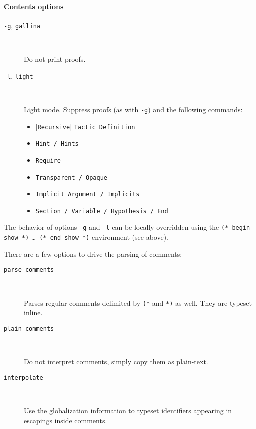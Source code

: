 \paragraph{Contents options}
\begin{description}

\item[\texttt{-g}, \texttt{\mm{}gallina}] ~\par

  Do not print proofs.

\item[\texttt{-l}, \texttt{\mm{}light}] ~\par

  Light mode. Suppress proofs (as with \texttt{-g}) and the following commands:
  \begin{itemize}
  \item {}[\texttt{Recursive}] \texttt{Tactic Definition}
  \item \texttt{Hint / Hints}
  \item \texttt{Require}
  \item \texttt{Transparent / Opaque}
  \item \texttt{Implicit Argument / Implicits}
  \item \texttt{Section / Variable / Hypothesis / End}
  \end{itemize}

\end{description}
The behavior of options \texttt{-g} and \texttt{-l} can be locally
overridden using the \texttt{(* begin show *)} \dots\ \texttt{(* end
  show *)} environment (see above).

There are a few options to drive the parsing of comments:
\begin{description}
\item[\texttt{\mm{}parse-comments}] ~\par

  Parses regular comments delimited by \texttt{(*} and \texttt{*)} as
  well. They are typeset inline.

\item[\texttt{\mm{}plain-comments}] ~\par

  Do not interpret comments, simply copy them as plain-text.

\item[\texttt{\mm{}interpolate}] ~\par

  Use the globalization information to typeset identifiers appearing in
  \Coq{} escapings inside comments.
\end{description}


